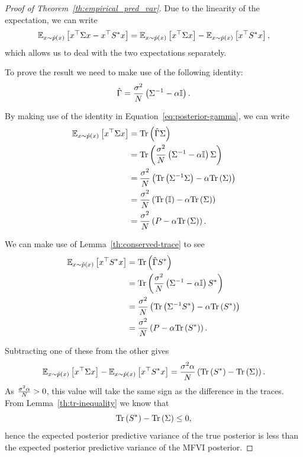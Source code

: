 \begin{proof}[Proof of Theorem~\ref{th:empirical_pred_var}]
Due to the linearity of the expectation, we can write 
\begin{align}
\mathbb{E}_{x\sim \hat p (x) }\left[x^\top  \Sigma x - x^\top  S^*  x \right] = \mathbb{E}_{x\sim \hat p (x)}\left[x^\top  \Sigma x\right]  - \mathbb{E}_{x\sim \hat p (x)}\left[x^\top  S^*  x \right],
\end{align}
which allows us to deal with the two expectations separately. 

To prove the result we need to make use of the following identity:
\begin{equation} \label{eq:posterior-gamma}
 \hat \Gamma =\frac{\sigma^2}{N} \left(\Sigma^{-1} - \alpha \mathbb{I} \right) . 
\end{equation}

By making use of the identity in Equation~\eqref{eq:posterior-gamma}, we can write
\begin{align}
    \mathbb{E}_{x\sim \hat p (x)}\left[x^\top  \Sigma x \right] &= \text{Tr}\left(\hat \Gamma \Sigma\right) \nonumber
    \\ &= \text{Tr}\left(\frac{\sigma^2}{N} \left(\Sigma^{-1} - \alpha \mathbb{I} \right) \Sigma\right) \nonumber
    \\ &= \frac{\sigma^2}{N} \left( \text{Tr}\left(\Sigma^{-1}\Sigma\right) - \alpha \text{Tr}\left(\Sigma\right) \right) \nonumber
    \\ &= \frac{\sigma^2}{N} \left( \text{Tr}\left(\mathbb{I}\right) - \alpha \text{Tr}\left(\Sigma\right) \right) \nonumber
    \\ &= \frac{\sigma^2}{N} \left(P - \alpha \text{Tr}\left(\Sigma\right)\right).
\end{align}

We can make use of Lemma~\ref{th:conserved-trace} to see
\begin{align}
    \mathbb{E}_{x\sim \hat p (x)}\left[x^\top  S^*  x \right] &= \text{Tr}\left(\hat \Gamma S^*\right) \nonumber
     \\ &= \text{Tr}\left(\frac{\sigma^2}{N} \left(\Sigma^{-1} - \alpha \mathbb{I} \right) S^*\right) \nonumber
     \\ &= \frac{\sigma^2}{N} \left(\text{Tr}\left(\Sigma^{-1}S^*\right) - \alpha \text{Tr}\left(S^*\right) \right) \nonumber
     \\ &= \frac{\sigma^2}{N} \left(P - \alpha \text{Tr}\left(S^*\right)\right).
\end{align}


Subtracting one of these from the other gives 
\begin{align}
    \mathbb{E}_{x\sim \hat p (x)}\left[x^\top  \Sigma x \right]  - \mathbb{E}_{x\sim \hat p (x)}\left[x^\top  S^*  x \right] = \frac{\sigma^2 \alpha }{N} \left( \text{Tr}\left(S^* \right) - \text{Tr}\left(\Sigma\right)\right).
\end{align}
As $\frac{\sigma^2 \alpha }{N} > 0$, this value will take the same sign as the difference in the traces. From Lemma~\ref{th:tr-inequality} we know that 
\begin{equation}
    \text{Tr}\left(S^* \right) - \text{Tr}\left(\Sigma\right) \leq 0, 
\end{equation}
hence the expected posterior predictive variance of the true posterior is less than the expected posterior predictive variance of the MFVI posterior. 
\end{proof}

